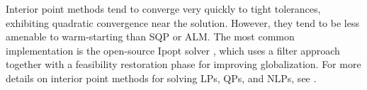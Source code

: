 \documentclass[../root.tex]{subfiles}
\begin{document}
    Interior point methods tend to converge very quickly to tight tolerances, exhibiting 
    quadratic convergence near the solution. However, they tend to be less amenable to 
    warm-starting than SQP or ALM. The most common implementation is the open-source 
    Ipopt solver \cite{wachter_implementation_2006}, which uses a filter approach together 
    with a feasibility restoration phase for improving globalization. For more details on
    interior point methods for solving LPs, QPs, and NLPs, see 
    \cite{nocedal_Numerical_2006}.
\end{document}
